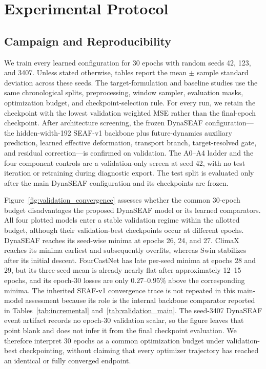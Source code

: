 \documentclass[conference]{IEEEtran}
\begin{document}
\section{Experimental Protocol}

\subsection{Campaign and Reproducibility}
We train every learned configuration for 30 epochs with random seeds 42, 123, and 3407. Unless stated otherwise, tables report the mean $\pm$ sample standard deviation across these seeds. The target-formulation and baseline studies use the same chronological splits, preprocessing, window sampler, evaluation masks, optimization budget, and checkpoint-selection rule. For every run, we retain the checkpoint with the lowest validation weighted MSE rather than the final-epoch checkpoint. After architecture screening, the frozen DynaSEAF configuration---the hidden-width-192 SEAF-v1 backbone plus future-dynamics auxiliary prediction, learned effective deformation, transport branch, target-resolved gate, and residual correction---is confirmed on validation. The A0--A4 ladder and the four component controls are a validation-only screen at seed 42, with no test iteration or retraining during diagnostic export. The test split is evaluated only after the main DynaSEAF configuration and its checkpoints are frozen.

Figure~\ref{fig:validation_convergence} assesses whether the common 30-epoch budget disadvantages the proposed DynaSEAF model or its learned comparators. All four plotted models enter a stable validation regime within the allotted budget, although their validation-best checkpoints occur at different epochs. DynaSEAF reaches its seed-wise minima at epochs 26, 24, and 27. ClimaX reaches its minima earliest and subsequently overfits, whereas Swin stabilizes after its initial descent. FourCastNet has late per-seed minima at epochs 28 and 29, but its three-seed mean is already nearly flat after approximately 12--15 epochs, and its epoch-30 losses are only $0.27$--$0.95\%$ above the corresponding minima. The inherited SEAF-v1 convergence trace is not repeated in this main-model assessment because its role is the internal backbone comparator reported in Tables~\ref{tab:incremental} and~\ref{tab:validation_main}. The seed-3407 DynaSEAF event artifact records no epoch-30 validation scalar, so the figure leaves that point blank and does not infer it from the final checkpoint evaluation. We therefore interpret 30 epochs as a common optimization budget under validation-best checkpointing, without claiming that every optimizer trajectory has reached an identical or fully converged endpoint.
\end{document}
